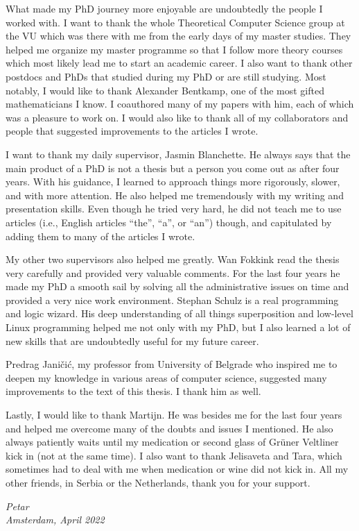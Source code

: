What made my PhD journey more enjoyable are undoubtedly the people I worked
with. I want to thank the whole Theoretical Computer Science group at the VU
which was there with me from the early days of my master studies. They helped me
organize my master programme so that I follow more theory courses which most
likely lead  me to start an academic career. I also want to thank other postdocs
and PhDs that studied during my PhD or are still studying. Most notably, I would
like to thank Alexander Bentkamp, one of the most gifted mathematicians I know.
I coauthored many of my papers with him, each of which was a pleasure to work
on. I would also like to thank all of my collaborators and people that suggested
improvements to the articles I wrote.

I want to thank my daily supervisor, Jasmin Blanchette. He always says that the
main product of a PhD is not a thesis but a person you come out as after four
years. With his guidance, I learned to approach things more rigorously, slower,
and with more attention. He also helped me tremendously  with my writing and
presentation skills. Even though he tried very hard, he did not teach me to use
articles (i.e., English articles ``the'', ``a'', or ``an'') though, and
capitulated by adding them to many of the articles I wrote.

My other two supervisors also helped me greatly. Wan Fokkink read the thesis
very carefully and provided very valuable comments. For the last four years he
made my PhD a smooth sail by solving all the administrative issues on time and
provided a very nice work environment. Stephan Schulz is a real programming and
logic wizard. His deep understanding of all things superposition and low-level
Linux programming helped me not only with my PhD, but I also learned a lot of
new skills that are undoubtedly useful for my future career.

Predrag Jani\v{c}i\'{c}, my professor from University of Belgrade who 
inspired me to deepen my knowledge in various areas of computer science, suggested
many improvements to the text of this thesis. I thank him as well.

Lastly, I would like to thank Martijn. He was besides me for the last four years
and helped me overcome many of the doubts and issues I mentioned. He also always
patiently waits until my medication or second glass of Grüner Veltliner kick in
(not at the same time). I also want to thank Jelisaveta and Tara, which
sometimes had to deal with me when medication or wine did not kick in. All my other friends,
in Serbia or the Netherlands, thank you for your support.

 

\begin{flushright}
{\makeatletter\itshape
    Petar \\
    Amsterdam, April 2022
\makeatother}
\end{flushright}


